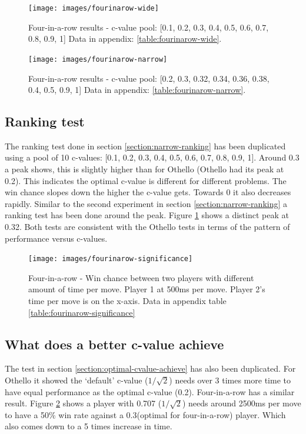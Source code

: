\documentclass[
11pt, %
english, %
singlespacing, %
headsepline, %
]{MastersDoctoralThesis} %
\begin{document}
\begin{figure}
	\captionsetup{width=.45\textwidth}
	\begin{minipage}[t]{0.49\textwidth}
		\centering
		\texttt{[image: images/fourinarow-wide]}
		\caption{Four-in-a-row results - c-value pool: [0.1, 0.2, 0.3, 0.4, 0.5, 0.6, 0.7, 0.8, 0.9, 1] Data in appendix: \ref{table:fourinarow-wide}.}
		\label{fig:fourinarow-wide}
	\end{minipage}
	\begin{minipage}[t]{0.49\textwidth}
		\centering
		\texttt{[image: images/fourinarow-narrow]}
		\caption{Four-in-a-row results - c-value pool: [0.2, 0.3, 0.32, 0.34, 0.36, 0.38, 0.4, 0.5, 0.9, 1] Data in appendix: \ref{table:fourinarow-narrow}.}
		\label{fig:fourinarow-narrow}
	\end{minipage}
\end{figure}
\subsection{Ranking test}
The ranking test done in section \ref{section:narrow-ranking} has been duplicated using a pool of 10 c-values: [0.1, 0.2, 0.3, 0.4, 0.5, 0.6, 0.7, 0.8, 0.9, 1]. Around 0.3 a peak shows, this is slightly higher than for Othello (Othello had its peak at 0.2). This indicates the optimal c-value is different for different problems. The win chance slopes down the higher the c-value gets. Towards 0 it also decreases rapidly. Similar to the second experiment in section \ref{section:narrow-ranking} a ranking test has been done around the peak. Figure \ref{fig:fourinarow-narrow} shows a distinct peak at 0.32. Both tests are consistent with the Othello tests in terms of the pattern of performance versus c-values.

\begin{figure}
	\centering
	\texttt{[image: images/fourinarow-significance]}
	\caption{Four-in-a-row - Win chance between two players with different amount of time per move. Player 1 at 500ms per move. Player 2's time per move is on the x-axis. Data in appendix table \ref{table:fourinarow-significance}}
	\label{fig:fourinarow-significance}
\end{figure}
\subsection{What does a better c-value achieve}
The test in section \ref{section:optimal-cvalue-achieve} has also been duplicated. For Othello it showed the `default' c-value ($1/\sqrt{2}$) needs over 3 times more time to have equal performance as the optimal c-value (0.2). Four-in-a-row has a similar result. Figure \ref{fig:fourinarow-significance} shows a player with 0.707 ($1/\sqrt{2}$) needs around 2500ms per move to have a 50\% win rate against a 0.3(optimal for four-in-a-row) player. Which also comes down to a 5 times increase in time.
\end{document}
